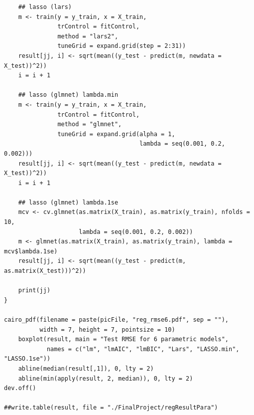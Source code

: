 \documentclass[11pt,oneside,a4paper]{article}
\begin{document}
\begin{verbatim}
    ## lasso (lars)
    m <- train(y = y_train, x = X_train,
               trControl = fitControl,
               method = "lars2", 
               tuneGrid = expand.grid(step = 2:31))
    result[jj, i] <- sqrt(mean((y_test - predict(m, newdata = X_test))^2))
    i = i + 1
    
    ## lasso (glmnet) lambda.min
    m <- train(y = y_train, x = X_train,
               trControl = fitControl,
               method = "glmnet", 
               tuneGrid = expand.grid(alpha = 1, 
                                      lambda = seq(0.001, 0.2, 0.002)))
    result[jj, i] <- sqrt(mean((y_test - predict(m, newdata = X_test))^2))
    i = i + 1
    
    ## lasso (glmnet) lambda.1se
    mcv <- cv.glmnet(as.matrix(X_train), as.matrix(y_train), nfolds = 10, 
                     lambda = seq(0.001, 0.2, 0.002))
    m <- glmnet(as.matrix(X_train), as.matrix(y_train), lambda = mcv$lambda.1se)
    result[jj, i] <- sqrt(mean((y_test - predict(m, as.matrix(X_test)))^2))
    
    print(jj)
}

cairo_pdf(filename = paste(picFile, "reg_rmse6.pdf", sep = ""), 
          width = 7, height = 7, pointsize = 10)
    boxplot(result, main = "Test RMSE for 6 parametric models",
            names = c("lm", "lmAIC", "lmBIC", "Lars", "LASSO.min", "LASSO.1se"))
    abline(median(result[,1]), 0, lty = 2)
    abline(min(apply(result, 2, median)), 0, lty = 2)
dev.off()

##write.table(result, file = "./FinalProject/regResultPara")
\end{verbatim}
\end{document}
